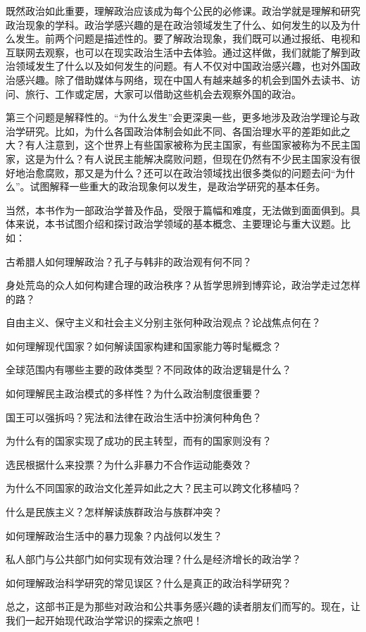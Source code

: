 既然政治如此重要，理解政治应该成为每个公民的必修课。政治学就是理解和研究政治现象的学科。政治学感兴趣的是在政治领域发生了什么、如何发生的以及为什么发生。前两个问题是描述性的。要了解政治现象，我们既可以通过报纸、电视和互联网去观察，也可以在现实政治生活中去体验。通过这样做，我们就能了解到政治领域发生了什么以及如何发生的问题。有人不仅对中国政治感兴趣，也对外国政治感兴趣。除了借助媒体与网络，现在中国人有越来越多的机会到国外去读书、访问、旅行、工作或定居，大家可以借助这些机会去观察外国的政治。

第三个问题是解释性的。“为什么发生”会更深奥一些，更多地涉及政治学理论与政治学研究。比如，为什么各国政治体制会如此不同、各国治理水平的差距如此之大？有人注意到，这个世界上有些国家被称为民主国家，有些国家被称为不民主国家，这是为什么？有人说民主能解决腐败问题，但现在仍然有不少民主国家没有很好地治愈腐败，那又是为什么？还可以在政治领域找出很多类似的问题去问“为什么”。试图解释一些重大的政治现象何以发生，是政治学研究的基本任务。

当然，本书作为一部政治学普及作品，受限于篇幅和难度，无法做到面面俱到。具体来说，本书试图介绍和探讨政治学领域的基本概念、主要理论与重大议题。比如：

古希腊人如何理解政治？孔子与韩非的政治观有何不同？

身处荒岛的众人如何构建合理的政治秩序？从哲学思辨到博弈论，政治学走过怎样的路？

自由主义、保守主义和社会主义分别主张何种政治观点？论战焦点何在？

如何理解现代国家？如何解读国家构建和国家能力等时髦概念？

全球范围内有哪些主要的政体类型？不同政体的政治逻辑是什么？

如何理解民主政治模式的多样性？为什么政治制度很重要？

国王可以强拆吗？宪法和法律在政治生活中扮演何种角色？

为什么有的国家实现了成功的民主转型，而有的国家则没有？

选民根据什么来投票？为什么非暴力不合作运动能奏效？

为什么不同国家的政治文化差异如此之大？民主可以跨文化移植吗？

什么是民族主义？怎样解读族群政治与族群冲突？

如何理解政治生活中的暴力现象？内战何以发生？

私人部门与公共部门如何实现有效治理？什么是经济增长的政治学？

如何理解政治科学研究的常见误区？什么是真正的政治科学研究？

总之，这部书正是为那些对政治和公共事务感兴趣的读者朋友们而写的。现在，让我们一起开始现代政治学常识的探索之旅吧！
